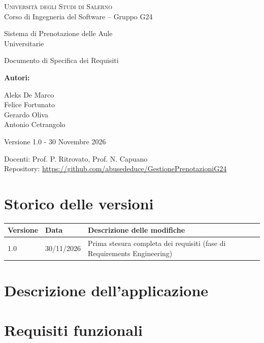 \documentclass[a4paper]{article}
\begin{document}
\begin{titlepage}
\centering
\textsc{Università degli Studi di Salerno}\\[0.3cm]
Corso di Ingegneria del Software -- Gruppo G24

\vspace{3cm}
{\huge Sistema di Prenotazione delle Aule\\ Universitarie\par}
\vspace{0.8cm}
{\large Documento di Specifica dei Requisiti\par}

\vspace{2.5cm}
{\large \textbf{Autori:}\par}
Aleks De Marco\\
Felice Fortunato\\
Gerardo Oliva\\
Antonio Cetrangolo

\vspace{2.5cm}
{\large Versione 1.0 - 30 Novembre 2026\par}
\vspace{0.5cm}
Docenti: Prof. P. Ritrovato, Prof. N. Capuano\\
Repository: \url{https://github.com/abusededuce/GestionePrenotazioniG24}
\end{titlepage}

\section*{Storico delle versioni}
\begin{center}
\begin{tabular}{|l|l|p{7cm}|}\hline
\textbf{Versione} & \textbf{Data} & \textbf{Descrizione delle modifiche} \\ \hline
1.0 & 30/11/2026 & Prima stesura completa dei requisiti (fase di Requirements Engineering) \\ \hline
\end{tabular}
\end{center}

\tableofcontents
\newpage

\section{Descrizione dell'applicazione}

\section{Requisiti funzionali}
\end{document}
